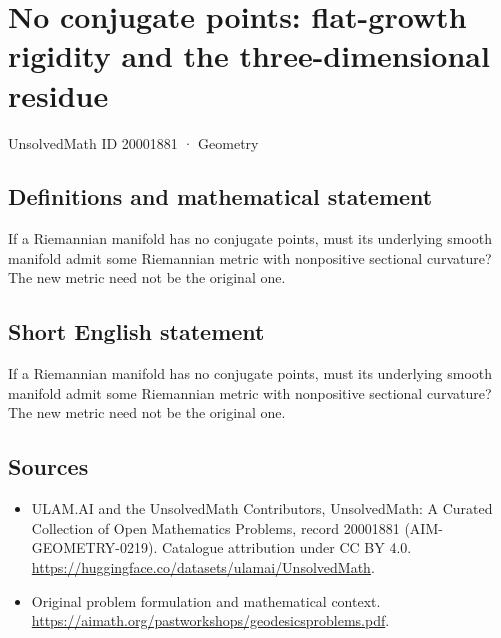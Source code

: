 \documentclass[11pt]{article}
\begin{document}
\setcounter{section}{20001880}
\section{No conjugate points: flat-growth rigidity and the three-dimensional residue}\label{20001881}
{\small UnsolvedMath ID 20001881 · Geometry}
\subsection{Definitions and mathematical statement}
If a Riemannian manifold has no conjugate points, must its underlying smooth manifold admit some Riemannian metric with nonpositive sectional curvature? The new metric need not be the original one.
\subsection{Short English statement}
If a Riemannian manifold has no conjugate points, must its underlying smooth manifold admit some Riemannian metric with nonpositive sectional curvature? The new metric need not be the original one.
\subsection{Sources}
\begin{itemize}
\item[\hypertarget{source:20001881:1}{S1}] ULAM.AI and the UnsolvedMath Contributors, UnsolvedMath: A Curated Collection of Open Mathematics Problems, record 20001881 (AIM-GEOMETRY-0219). Catalogue attribution under CC BY 4.0.
\url{https://huggingface.co/datasets/ulamai/UnsolvedMath}.
\item[\hypertarget{source:20001881:2}{S2}] Original problem formulation and mathematical context.
\url{https://aimath.org/pastworkshops/geodesicsproblems.pdf}.
\end{itemize}
\label{end:20001881}
\end{document}
